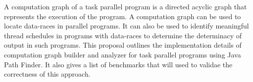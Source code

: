 A computation graph of a task parallel program is a directed acyclic graph that represents the execution of the program. A computation graph can be used to locate data-races in parallel programs. It can also be used to identify meaningful thread schedules in programs with data-races to determine the determinacy of output in such programs. This proposal outlines the implementation details of computation graph builder and analyzer for task parallel programs using Java Path Finder. It also gives a list of benchmarks that will used to  validae the correctness of this approach.
